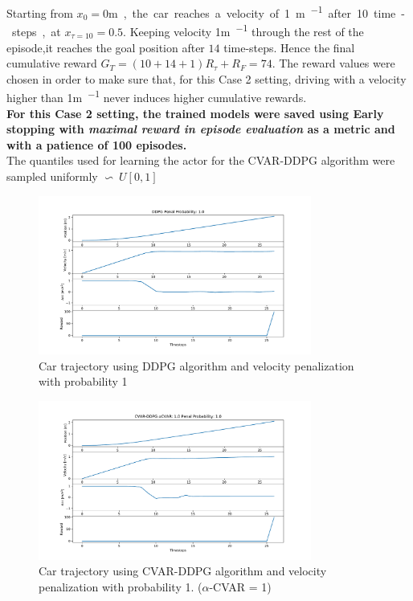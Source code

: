 Starting from $x_0=0$\si\metre, the car reaches a velocity of 1\si{\metre\per\ts} after 10 time-steps, at $x_{\tau=10}=0.5$. Keeping velocity 1\si{\metre\per\ts} through the rest of the episode,it reaches the goal position after $14$ time-steps. Hence the final cumulative reward $G_T= (10+14+1) R_{\tau} + R_{F}=74$.
The reward values were chosen in order to make sure that, for this Case 2 setting, driving with a velocity higher than 1\si{\metre\per\ts} never induces higher cumulative rewards.\\

\textbf{For this Case 2 setting, the trained models were saved using Early stopping with \textit{maximal reward in episode evaluation} as a metric and with a patience of 100 episodes.}\\
The quantiles used for learning the actor for the CVAR-DDPG algorithm were sampled uniformly $\backsim\ U[0,1] $

\begin{figure}[ht]
        \centering
        \includegraphics[width=0.8\textwidth]{images/DDPG/Trajectory_DDPG_ppenal1.pdf}
        \caption{Car trajectory using DDPG algorithm and velocity penalization with probability 1 }
        \label{traj1_ddpg_probpenal1}
    
\end{figure}


\begin{figure}[ht]
        \centering
        \includegraphics[width=0.8\textwidth]{images/CVAR/Trajectory_CVAR_ppenal1.pdf}
        \caption{Car trajectory using CVAR-DDPG algorithm and velocity penalization with probability 1. ($\alpha$-CVAR = 1)}
        \label{traj_cvarddpg_probpenal1_cvar1}
    
\end{figure}

